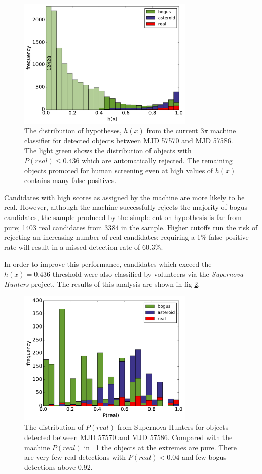 \documentclass[a4paper,fleqn,usenatbib]{mnras}
\begin{document}
\begin{figure}
   \includegraphics[width=84mm]{figs/machine_hist.pdf}
   \caption{The distribution of hypotheses, $h(x)$ from the current 3$\pi$ machine classifier 
            for detected objects between MJD 57570 and MJD 57586.  The light green shows the distribution of 
            objects with $P(real) \leq 0.436$ which are automatically rejected.  The remaining 
            objects promoted for human screening even at high values of $h(x)$ contains
            many false positives.} 
   \label{fig:machine_dist} 
\end{figure}

Candidates with high scores as assigned by the machine are more likely to be real. However, although the machine successfully rejects the majority of bogus candidates, the sample produced by the simple cut on hypothesis is far from pure; 1403 real candidates from 3384 in the sample. Higher cutoffs run the risk of rejecting an increasing number of real candidates; requiring a 1\% false positive rate will result in a missed detection rate of 60.3\%. 

In order to improve this performance, candidates which exceed the $h(x) = 0.436$ threshold were also classified by volunteers via the \emph{Supernova Hunters} project. The results of this analysis are shown in fig \ref{fig:human_dist}. 

\begin{figure}
   \includegraphics[width=84mm]{figs/human_hist.pdf}
   \caption{The distribution of $P(real)$ from Supernova Hunters for objects detected between 
            MJD 57570 and MJD 57586.  Compared with the machine $P(real)$ in ~\ref{fig:machine_dist}
            the objects at the extremes are pure.  There are very few real detections with 
            $P(real) < 0.04$ and few bogus detections above 0.92.} 
   \label{fig:human_dist} 
\end{figure}
\end{document}
